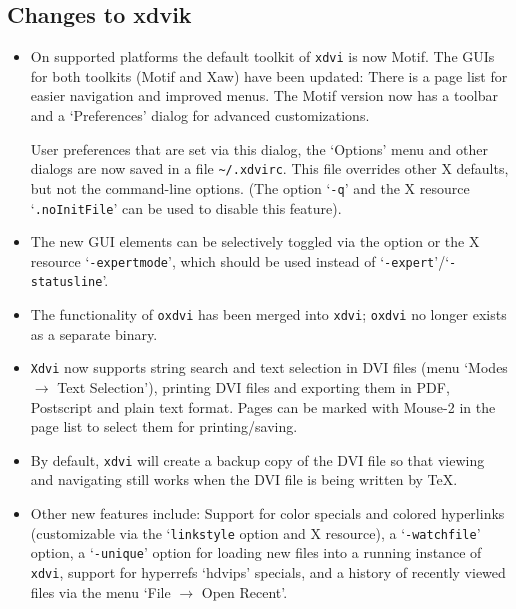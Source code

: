 \documentclass[11pt,a4paper]{article}
\begin{document}
\subsection{Changes to xdvik}
\begin{itemize}
\item On supported platforms the default toolkit of \verb+xdvi+
   is now Motif. The GUIs for both toolkits (Motif and Xaw) have
   been updated: There is a page list for easier navigation and
   improved menus.  The Motif version now has a toolbar and a
   `Preferences' dialog for advanced customizations.

   User preferences that are set via this dialog, the `Options'
   menu and other dialogs are now saved in a file
   \verb+~/.xdvirc+. This file overrides other X defaults, but
   not the command-line options. (The option `\verb+-q+' and the X resource
   `\verb+.noInitFile+' can be used to disable
   this feature).

\item The new GUI elements can be selectively toggled via the
   option or the X resource `\verb+-expertmode+', which should be
   used instead of `\verb+-expert+'\slash`\verb+-statusline+'.

\item The functionality of \verb+oxdvi+ has been merged into
   \verb+xdvi+; \verb+oxdvi+ no longer exists as a separate binary.

\item \verb+Xdvi+ now supports string search and text selection
   in DVI files (menu `Modes $\rightarrow$ Text Selection'),
   printing DVI files and exporting them in PDF, Postscript and
   plain text format. Pages can be marked with Mouse-2 in the
   page list to select them for printing\slash saving.

\item By default, \verb+xdvi+ will create a backup copy of the
   DVI file so that viewing and navigating still works when the
   DVI file is being written by \TeX.

\item Other new features include: Support for color specials and
   colored hyperlinks (customizable via the `\verb+linkstyle+
   option and X resource), a `\verb+-watchfile+' option, a
   `\verb+-unique+' option for loading new files into a running
   instance of \verb+xdvi+, support for hyperrefs `hdvips'
   specials, and a history of recently viewed files via the menu
   `File $\rightarrow$ Open Recent'.
\end{itemize}
\end{document}
